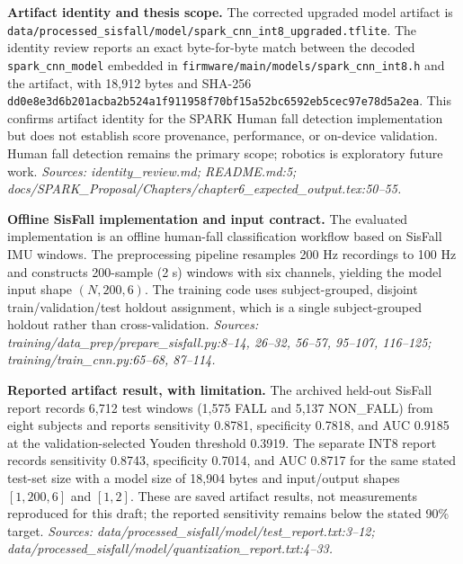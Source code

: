 
\noindent\textbf{Artifact identity and thesis scope.}
The corrected upgraded model artifact is \texttt{data/processed\_sisfall/model/spark\_cnn\_int8\_upgraded.tflite}. The identity review reports an exact byte-for-byte match between the decoded \texttt{spark\_cnn\_model} embedded in \texttt{firmware/main/models/spark\_cnn\_int8.h} and the artifact, with 18,912 bytes and SHA-256 \texttt{dd0e8e3d6b201acba2b524a1f911958f70bf15a52bc6592eb5cec97e78d5a2ea}. This confirms artifact identity for the SPARK Human fall detection implementation but does not establish score provenance, performance, or on-device validation. Human fall detection remains the primary scope; robotics is exploratory future work. \textit{Sources: identity\_review.md; README.md:5; docs/SPARK\_Proposal/Chapters/chapter6\_expected\_output.tex:50--55.}

\noindent\textbf{Offline SisFall implementation and input contract.}
The evaluated implementation is an offline human-fall classification workflow based on SisFall IMU windows. The preprocessing pipeline resamples 200 Hz recordings to 100 Hz and constructs 200-sample (2 s) windows with six channels, yielding the model input shape $(N, 200, 6)$. The training code uses subject-grouped, disjoint train/validation/test holdout assignment, which is a single subject-grouped holdout rather than cross-validation. \textit{Sources: training/data\_prep/prepare\_sisfall.py:8--14, 26--32, 56--57, 95--107, 116--125; training/train\_cnn.py:65--68, 87--114.}

\noindent\textbf{Reported artifact result, with limitation.}
The archived held-out SisFall report records 6,712 test windows (1,575 FALL and 5,137 NON\_FALL) from eight subjects and reports sensitivity 0.8781, specificity 0.7818, and AUC 0.9185 at the validation-selected Youden threshold 0.3919. The separate INT8 report records sensitivity 0.8743, specificity 0.7014, and AUC 0.8717 for the same stated test-set size with a model size of 18,904 bytes and input/output shapes \([1,200,6]\) and \([1,2]\). These are saved artifact results, not measurements reproduced for this draft; the reported sensitivity remains below the stated 90\% target. \textit{Sources: data/processed\_sisfall/model/test\_report.txt:3--12; data/processed\_sisfall/model/quantization\_report.txt:4--33.}

